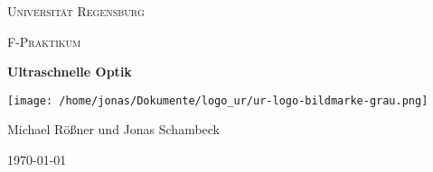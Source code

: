 \begin{titlepage}
	\centering
	{\scshape \LARGE Universität Regensburg \par}
	\vspace{1cm}
	{\scshape\Large F-Praktikum\par}
	\vspace{1.5cm}
	{\huge\bfseries Ultraschnelle Optik\par}
	\vspace{2cm}
	\texttt{[image: /home/jonas/Dokumente/logo\_ur/ur-logo-bildmarke-grau.png]}\par
	\vfill
	{\large Michael Rößner und Jonas Schambeck\par}

	\vfill

	{\large \today\par}
\end{titlepage}
